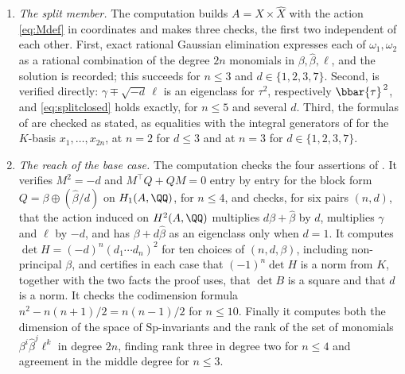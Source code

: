 \begin{enumerate}[label=\textup{(\Roman*)},leftmargin=*]
\item \emph{The split member.} The computation builds
  $A=X\times\widehat{X}$ with the action \eqref{eq:Mdef} in coordinates and
  makes three checks, the first two independent of each other. First, exact
  rational Gaussian elimination expresses each of $\omega_{1},\omega_{2}$ as
  a rational combination of the degree $2n$ monomials in
  $\beta,\widehat{\beta},\ell$, and the solution is recorded; this succeeds
  for $n\le3$ and $d\in\{1,2,3,7\}$. Second,  is
  verified directly: $\gamma\mp\sqrt{-d}\,\ell$ is an eigenclass for
  $\tau^{2}$, respectively $\bbar{\tau}^{\,2}$, and \eqref{eq:splitclosed}
  holds exactly, for $n\le5$ and several $d$. Third, the formulas of
   are checked as stated, as equalities with the
  integral generators of  for the $K$-basis
  $x_{1},\dots,x_{2n}$, at $n=2$ for $d\le3$ and at $n=3$ for
  $d\in\{1,2,3,7\}$.

\item \emph{The reach of the base case.} The computation checks the four
  assertions of . It verifies $M^{2}=-d$ and
  $M^{\top}Q+QM=0$ entry by entry for the block form
  $Q=\beta\oplus(\widehat\beta/d)$ on $H_{1}(A,\QQ)$, for $n\le4$, and checks,
  for six pairs $(n,d)$, that the action induced on $H^{2}(A,\QQ)$ multiplies
  $d\beta+\widehat\beta$ by $d$, multiplies $\gamma$ and $\ell$ by $-d$, and
  has $\beta+d\widehat\beta$ as an eigenclass only when $d=1$. It computes
  $\det H=(-d)^{n}(d_{1}\cdots d_{n})^{2}$ for ten choices of $(n,d,\beta)$,
  including non-principal $\beta$, and certifies in each case that
  $(-1)^{n}\det H$ is a norm from $K$, together with the two facts the proof
  uses, that $\det B$ is a square and that $d$ is a norm. It checks the
  codimension formula $n^{2}-n(n+1)/2=n(n-1)/2$ for $n\le10$. Finally it
  computes both the dimension of the space of $\mathrm{Sp}$-invariants and
  the rank of the set of monomials $\beta^{i}\widehat{\beta}^{j}\ell^{k}$ in
  degree $2n$, finding rank three in degree two for $n\le4$ and agreement in
  the middle degree for $n\le3$.


\end{enumerate}

